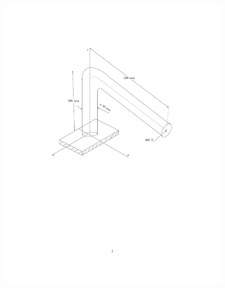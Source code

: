 \documentclass[journal,12pt,onecolumn,article]{IEEEtran}
\theoremstyle{remark}
\begin{document}
\begin{enumerate}
		\begin{figure}[H]
	\centering
	\includegraphics[width=0.7\linewidth]{fig/fig80/main.pdf}
\end{figure}
\vspace{-150pt}


\end{enumerate}
\end{document}
